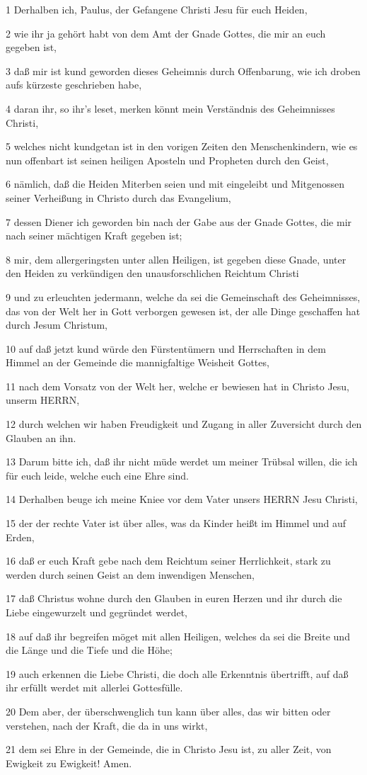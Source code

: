 \par 1 Derhalben ich, Paulus, der Gefangene Christi Jesu für euch Heiden,
\par 2 wie ihr ja gehört habt von dem Amt der Gnade Gottes, die mir an euch gegeben ist,
\par 3 daß mir ist kund geworden dieses Geheimnis durch Offenbarung, wie ich droben aufs kürzeste geschrieben habe,
\par 4 daran ihr, so ihr's leset, merken könnt mein Verständnis des Geheimnisses Christi,
\par 5 welches nicht kundgetan ist in den vorigen Zeiten den Menschenkindern, wie es nun offenbart ist seinen heiligen Aposteln und Propheten durch den Geist,
\par 6 nämlich, daß die Heiden Miterben seien und mit eingeleibt und Mitgenossen seiner Verheißung in Christo durch das Evangelium,
\par 7 dessen Diener ich geworden bin nach der Gabe aus der Gnade Gottes, die mir nach seiner mächtigen Kraft gegeben ist;
\par 8 mir, dem allergeringsten unter allen Heiligen, ist gegeben diese Gnade, unter den Heiden zu verkündigen den unausforschlichen Reichtum Christi
\par 9 und zu erleuchten jedermann, welche da sei die Gemeinschaft des Geheimnisses, das von der Welt her in Gott verborgen gewesen ist, der alle Dinge geschaffen hat durch Jesum Christum,
\par 10 auf daß jetzt kund würde den Fürstentümern und Herrschaften in dem Himmel an der Gemeinde die mannigfaltige Weisheit Gottes,
\par 11 nach dem Vorsatz von der Welt her, welche er bewiesen hat in Christo Jesu, unserm HERRN,
\par 12 durch welchen wir haben Freudigkeit und Zugang in aller Zuversicht durch den Glauben an ihn.
\par 13 Darum bitte ich, daß ihr nicht müde werdet um meiner Trübsal willen, die ich für euch leide, welche euch eine Ehre sind.
\par 14 Derhalben beuge ich meine Kniee vor dem Vater unsers HERRN Jesu Christi,
\par 15 der der rechte Vater ist über alles, was da Kinder heißt im Himmel und auf Erden,
\par 16 daß er euch Kraft gebe nach dem Reichtum seiner Herrlichkeit, stark zu werden durch seinen Geist an dem inwendigen Menschen,
\par 17 daß Christus wohne durch den Glauben in euren Herzen und ihr durch die Liebe eingewurzelt und gegründet werdet,
\par 18 auf daß ihr begreifen möget mit allen Heiligen, welches da sei die Breite und die Länge und die Tiefe und die Höhe;
\par 19 auch erkennen die Liebe Christi, die doch alle Erkenntnis übertrifft, auf daß ihr erfüllt werdet mit allerlei Gottesfülle.
\par 20 Dem aber, der überschwenglich tun kann über alles, das wir bitten oder verstehen, nach der Kraft, die da in uns wirkt,
\par 21 dem sei Ehre in der Gemeinde, die in Christo Jesu ist, zu aller Zeit, von Ewigkeit zu Ewigkeit! Amen.

